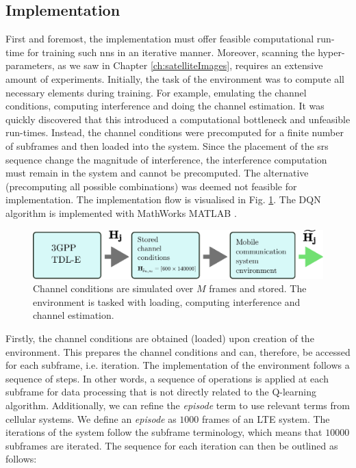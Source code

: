 \subsection{Implementation}
First and foremost, the implementation must offer feasible computational run-time for training such \glspl{nn} in an iterative manner. Moreover,  scanning the hyper-parameters, as we saw in Chapter \ref{ch:satelliteImages}, requires an extensive amount of experiments. Initially, the task of the environment was to compute all necessary elements during training. For example, emulating the channel conditions, computing interference and doing the channel estimation. It was quickly discovered that this introduced a computational bottleneck and unfeasible run-times. Instead, the channel conditions were precomputed for a finite number of subframes and then loaded into the system. Since the placement of the \gls{srs} sequence change the magnitude of interference, the interference computation must remain in the system and cannot be precomputed. The alternative (precomputing all possible combinations) was deemed not feasible for implementation. The implementation flow is visualised in Fig. \ref{fig:environment_implementation}. The DQN algorithm is implemented with MathWorks MATLAB \cite{MATLABRL_toolbox}. 
\begin{figure}
    \centering
    \includegraphics{chapters/part_uplink/figures/environment_implementation.eps}
    \caption{Channel conditions are simulated over $M$ frames and stored. The environment is tasked with loading, computing interference and channel estimation.}
    \label{fig:environment_implementation}
\end{figure}

Firstly, the channel conditions are obtained (loaded) upon creation of the environment. This prepares the channel conditions and can, therefore, be accessed for each subframe, i.e. iteration. The implementation of the environment follows a sequence of steps. In other words, a sequence of operations is applied at each subframe for data processing that is not directly related to the Q-learning algorithm. Additionally, we can refine the \emph{episode} term to use relevant terms from cellular systems. We define an \emph{episode} as $1000$ frames of an LTE system. The iterations of the system follow the subframe terminology, which means that $10000$ subframes are iterated. The sequence for each iteration can then be outlined as follows:


